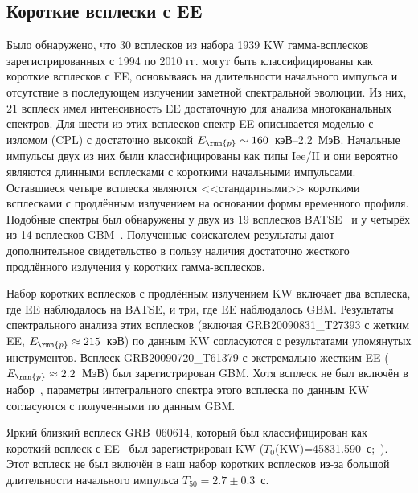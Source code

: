 \subsection{Короткие всплески с EE}
Было обнаружено, что 30 всплесков из набора 1939 KW гамма-всплесков зарегистрированных
с 1994 по 2010 гг. могут быть классифицированы как короткие всплесков с EE, 
основываясь на длительности начального импульса и отсутствие в последующем излучении 
заметной спектральной эволюции. Из них, 21 всплеск имел интенсивность EE достаточную
для анализа многоканальных спектров. Для шести из этих всплесков спектр EE описывается
моделью с изломом (CPL) с достаточно высокой $E_\rmn{p} \sim 160$~кэВ--2.2~МэВ.
Начальные импульсы двух из них были классифицированы как типы Iee/II и они вероятно
являются длинными всплесками с короткими начальными импульсами. Оставшиеся четыре всплеска 
являются <<стандартными>> короткими всплесками с продлённым излучением на основании 
формы временного профиля. Подобные спектры был обнаружены у двух из 19 всплесков BATSE~\citep{Bostanci_2013MNRAS}
и у четырёх из 14 всплесков GBM~\citep{Kaneko_2015MNRAS}. 
Полученные соискателем результаты дают дополнительное свидетельство в пользу наличия 
достаточно жесткого продлённого излучения у коротких гамма-всплесков. 

Набор коротких всплесков с продлённым излучением KW включает два всплеска, 
где EE наблюдалось на BATSE, и три, где EE наблюдалось GBM. 
Результаты спектрального анализа этих всплесков (включая GRB20090831\_T27393 с жетким EE, 
$E_\rmn{p} \approx 215$~кэВ) по данным KW согласуются с результатами упомянутых инструментов.
Всплеск GRB20090720\_T61379 с экстремально жестким EE ($E_\rmn{p} \approx 2.2$~МэВ) 
был зарегистрирован GBM. Хотя всплеск не был включён в набор~\citep{Kaneko_2015MNRAS},
параметры интегрального спектра этого всплеска по данным KW согласуются с полученными 
по данным GBM.
 
Яркий близкий всплеск GRB~060614, который был классифицирован как короткий 
всплеск с EE~\citep{Gehrels_2006Nature} был зарегистрирован KW ($T_0$(KW)=45831.590~с;~\citep{Golenetskii_GCN5264}).
Этот всплеск не был включён в наш набор коротких всплесков из-за большой 
длительности начального импульса $T_{50}=2.7 \pm 0.3$~с.

